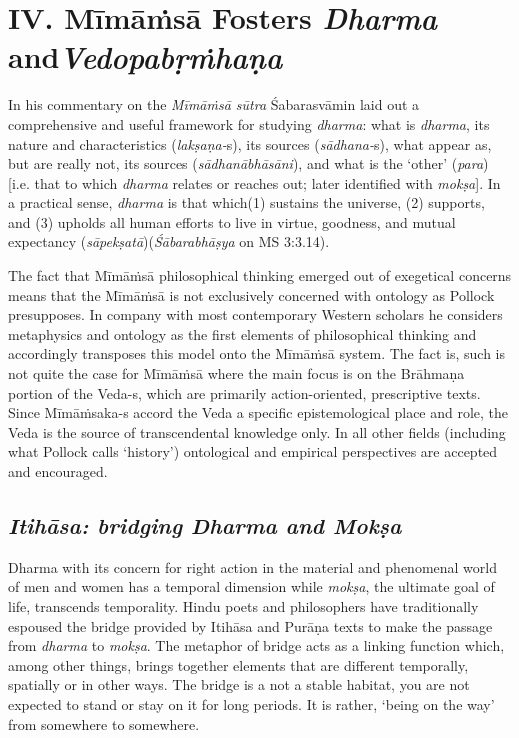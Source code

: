 \section*{IV. Mīmāṁsā Fosters \textit{Dharma} and\hfill \break \textit{Vedopabṛṁhaṇa}}

In his commentary on the \textit{Mīmāṁsā sūtra} Śabarasvāmin laid out a comprehensive and useful framework for studying \textit{dharma}: what is \textit{dharma}, its nature and characteristics (\textit{lakṣaṇa-}s), its sources \hbox{(\textit{sādhana-}s)}, what appear as, but are really not, its sources (\textit{sādhanābhāsāni}), and what is the ‘other’ (\textit{para}) [i.e. that to which \textit{dharma} relates or reaches out; later identified with \textit{mokṣa}]. In a practical sense, \textit{dharma} is that which\break (1) sustains the universe, (2) supports, and (3) upholds all human efforts to live in virtue, goodness, and mutual expectancy (\textit{sāpekṣatā})\break(\textit{Śābarabhāṣya} on MS 3:3.14).

The fact that Mīmāṁsā philosophical thinking emerged out of exegetical concerns means that the Mīmāṁsā is not exclusively concerned with ontology as Pollock presupposes. In company with most contemporary Western scholars he considers metaphysics and ontology as the first elements of philosophical thinking and accordingly transposes this model onto the Mīmāṁsā system. The fact is, such is not quite the case for Mīmāṁsā where the main focus is on the Brāhmaṇa portion of the Veda-s, which are primarily action-oriented, prescriptive texts. Since Mīmāṁsaka-s accord the Veda a specific epistemological place and role, the Veda is the source of transcendental knowledge only. In all other fields (including what Pollock calls ‘history’) ontological and empirical perspectives are accepted and encouraged.

\subsection*{\textit{Itihāsa: bridging Dharma and Mokṣa}}

Dharma with its concern for right action in the material and phenomenal world of men and women has a temporal dimension while \textit{mokṣa}, the ultimate goal of life, transcends temporality. Hindu poets and philosophers have traditionally espoused the bridge provided by Itihāsa and Purāṇa texts to make the passage from \textit{dharma} to \textit{mokṣa}. The metaphor of bridge acts as a linking function which, among other things, brings together elements that are different temporally, spatially or in other ways. The bridge is a not a stable habitat, you are not expected to stand or stay on it for long periods. It is rather, ‘being on the way’ from somewhere to somewhere.

